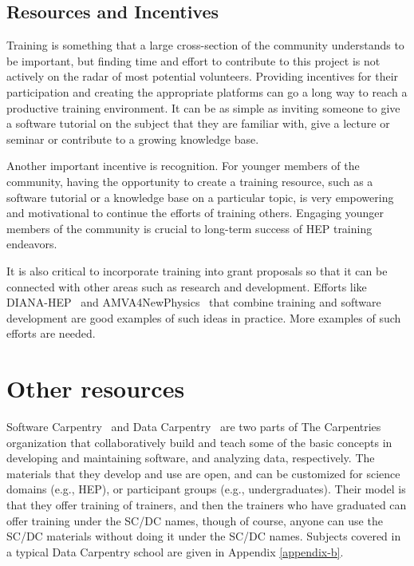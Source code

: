 \documentclass[12pt,a4paper]{article}
\begin{document}
\subsection{Resources and Incentives}

Training is something that a large cross-section of the community
understands to be important, but finding time and effort to contribute to this
project is not actively on the radar of most potential volunteers. Providing
incentives for their participation and creating the appropriate platforms can go
a long way to reach a productive training environment. It can be as simple as
inviting someone to give a software tutorial on the subject that they are
familiar with, give a lecture or seminar or contribute to a growing knowledge
base.

Another important incentive is recognition. For younger members of the
community, having the opportunity to create a training resource, such as a
software tutorial or a knowledge base on a particular topic, is very empowering
and motivational to continue the efforts of training others. Engaging younger
members of the community is crucial to long-term success of HEP training
endeavors.

It is also critical to incorporate training into grant proposals so that it can
be connected with other areas such as research and development. Efforts like
DIANA-HEP~\cite{DIANA-HEP} and AMVA4NewPhysics~\cite{AMVA4NewPhysics}
that combine training
and software development are good examples of such ideas in practice. More
examples of such efforts are needed.


\section{Other resources}

Software Carpentry~\cite{SoftwareCarpentry} and Data
Carpentry~\cite{DataCarpentry} are two parts of The
Carpentries organization that collaboratively build and teach some of the basic
concepts in developing and maintaining software, and analyzing data,
respectively.  The materials that they develop and use are open, and can be
customized for science domains (e.g., HEP), or participant groups (e.g.,
undergraduates). Their model is that they offer training of trainers, and then
the trainers who have graduated can offer training under the SC/DC names, though
of course, anyone can use the SC/DC materials without doing it under the SC/DC
names.
Subjects covered in a typical Data Carpentry school are given in Appendix
\ref{appendix-b}.
\end{document}
